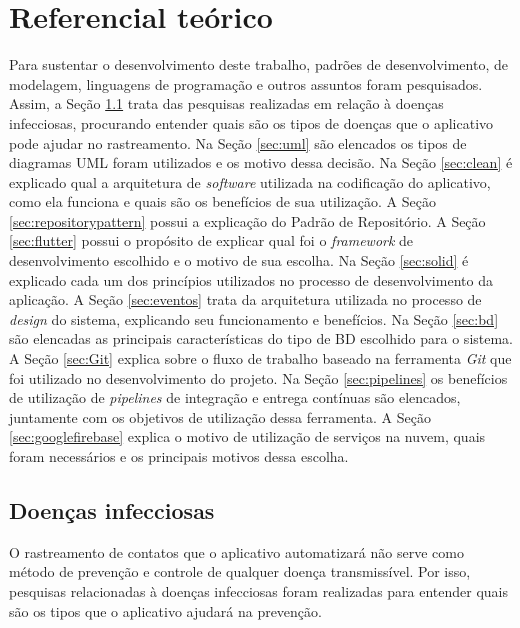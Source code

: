 \chapter{Referencial teórico}\label{chp:referencial}
Para sustentar o desenvolvimento deste trabalho, padrões de desenvolvimento, de modelagem, linguagens de programação e outros assuntos foram pesquisados. Assim, a Seção \ref{sec:infecciosas} trata das pesquisas realizadas em relação à doenças infecciosas, procurando entender quais são os tipos de doenças que o aplicativo pode ajudar no rastreamento. Na Seção \ref{sec:uml} são elencados os tipos de diagramas UML foram utilizados e os motivo dessa decisão. Na Seção \ref{sec:clean} é explicado qual a arquitetura de \textit{software} utilizada na codificação do aplicativo, como ela funciona e quais são os benefícios de sua utilização. A Seção \ref{sec:repositorypattern} possui a explicação do Padrão de Repositório. A Seção \ref{sec:flutter} possui o propósito de explicar qual foi o \textit{framework} de desenvolvimento escolhido e o motivo de sua escolha. Na Seção \ref{sec:solid} é explicado cada um dos princípios utilizados no processo de desenvolvimento da aplicação. A Seção \ref{sec:eventos} trata da arquitetura utilizada no processo de \textit{design} do sistema, explicando seu funcionamento e benefícios. Na Seção \ref{sec:bd} são elencadas as principais características do tipo de BD escolhido para o sistema. A Seção \ref{sec:Git} explica sobre o fluxo de trabalho baseado na ferramenta \textit{Git} que foi utilizado no desenvolvimento do projeto. Na Seção \ref{sec:pipelines} os benefícios de utilização de \textit{pipelines} de integração e entrega contínuas são elencados, juntamente com os objetivos de utilização dessa ferramenta. A Seção \ref{sec:googlefirebase} explica o motivo de utilização de serviços na nuvem, quais foram necessários e os principais motivos dessa escolha.

\section{Doenças infecciosas}\label{sec:infecciosas}
O rastreamento de contatos que o aplicativo automatizará não serve como método de prevenção e controle de qualquer doença transmissível. Por isso, pesquisas relacionadas à doenças infecciosas foram realizadas para entender quais são os tipos que o aplicativo ajudará na prevenção.

